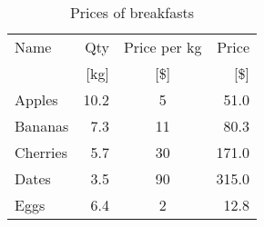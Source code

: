 \documentclass[11pt, a4paper]{article}
\begin{document}
\begin{table}[htb]
    \centering
    \caption{Prices of breakfasts}
    \label{tab:ex1}
    \begin{tabular}{@{}lrcr@{}}
        \toprule
        Name & Qty & Price per kg & Price \\\relax
         & [kg] & [\$] & [\$] \\
        \midrule
        Apples & 10.2 & 5 & 51.0 \\
        Bananas & 7.3 & 11 & 80.3 \\
        Cherries & 5.7 & 30 & 171.0 \\
        Dates & 3.5 & 90 & 315.0 \\
        Eggs & 6.4 & 2 & 12.8 \\
        \bottomrule
    \end{tabular}
\end{table}
\end{document}
